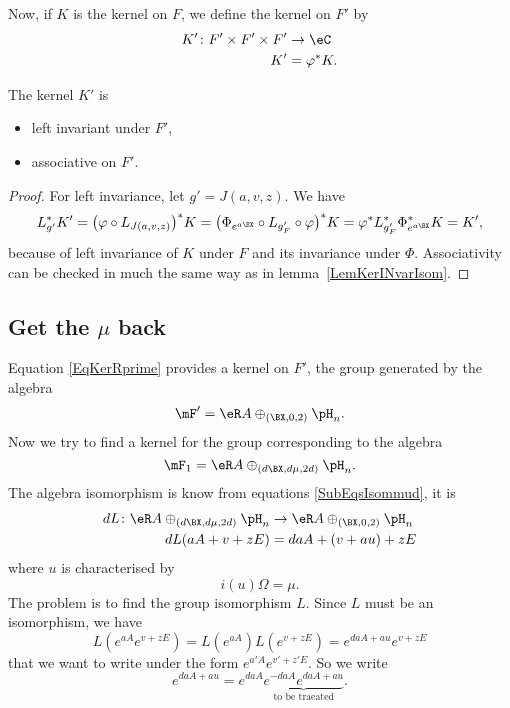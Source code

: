 Now, if $K$ is the kernel on $F$, we define the kernel on $F'$ by
\begin{equation}\label{EqKerRprime}
\begin{aligned}
 K'\colon F'\times F'\times F'&\to \eC\\
K'&=\varphi^*K.
\end{aligned}
\end{equation}


\begin{theorem}
The kernel $K'$ is
\begin{itemize}
\item left invariant under $F'$,
\item associative on $F'$.
\end{itemize}
 \label{ThoDefoHeizAvecB}
\end{theorem}
\begin{proof}
For left invariance, let $g'=J(a,v,z)$. We have
\[
  L_{g'}^*K'=\big( \varphi\circ L_{J(a,v,z)} \big)^*K=\big( \Phi_{ e^{a\BX}}\circ L_{g'_F}\circ\varphi \big)^*K=\varphi^*L_{g'_F}^*\Phi_{ e^{a\BX}}^*K=K',
\]
because of left invariance of $K$ under $F$ and its invariance under $\Phi$. Associativity can be checked in much the same way as in lemma~\ref{LemKerINvarIsom}.
\end{proof}

\subsection{Get the \texorpdfstring{$\mu$}{u} back}  \label{SubSecRemetreMu}

Equation \eqref{EqKerRprime} provides a kernel on $F'$, the group generated by the algebra
\[
  \mF'=\eR A\oplus_{(\BX ,0,2)}\pH_{n}.
\]
Now we try to find a kernel for the group corresponding to the algebra
\[
  \mF_{1}=\eR A\oplus_{(d\BX ,d\mu,2d)}\pH_{n}.
\]
The algebra isomorphism is know from equations \eqref{SubEqsIsommud}, it is
\begin{equation}
\begin{aligned}
 dL\colon \eR A\oplus_{(d\BX ,d\mu,2d)}\pH_{n}&\to \eR A\oplus_{(\BX ,0,2)}\pH_{n} \\
dL(aA+v+zE)&=daA+(v+au)+zE
\end{aligned}
\end{equation}
where $u$ is characterised by
\[
  i(u)\Omega=\mu.
\]
The problem is to find the group isomorphism $L$. Since $L$ must be an isomorphism, we have
\[
L( e^{aA} e^{v+zE})=L( e^{aA})L( e^{v+zE})
        = e^{daA+au} e^{v+zE}
\]
that we want to write under the form $ e^{a'A} e^{v'+z'E}$. So we write
\[
   e^{daA+au}= e^{daA}\underbrace{e^{-daA} e^{daA+au}}_{\text{to be traeated}}.
\]

